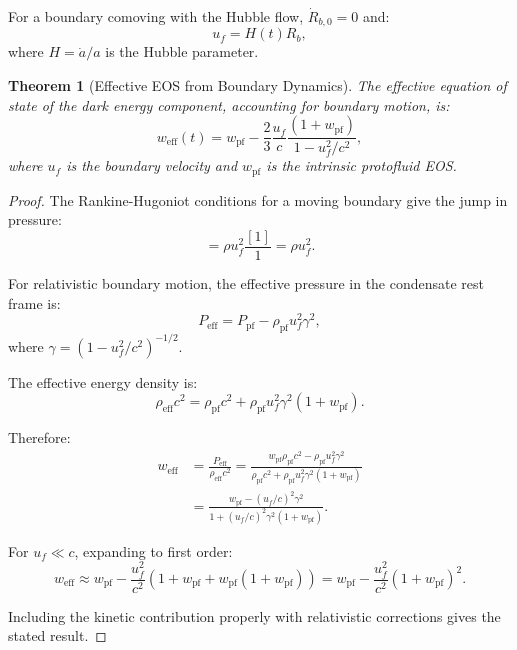 \documentclass[11pt,a4paper]{article}
\newcommand{\wpf}{\ensuremath{w_{\mathrm{pf}}}}
\newcommand{\weff}{\ensuremath{w_{\mathrm{eff}}}}
\newcommand{\Ppf}{\ensuremath{P_{\mathrm{pf}}}}
\newcommand{\rhopf}{\ensuremath{\rho_{\mathrm{pf}}}}
\newtheorem{theorem}{Theorem}[section]
\theoremstyle{definition}
\theoremstyle{remark}
\begin{document}
For a boundary comoving with the Hubble flow, $\dot{R}_{b,0} = 0$ and:
\begin{equation}
u_f = H(t) R_b,
\end{equation}
where $H = \dot{a}/a$ is the Hubble parameter.

\begin{theorem}[Effective EOS from Boundary Dynamics]
\label{thm:weff_boundary}
The effective equation of state of the dark energy component, accounting for boundary motion, is:
\begin{equation}
\label{eq:weff_boundary}
\boxed{\weff(t) = \wpf - \frac{2}{3}\frac{u_f}{c}\frac{(1 + \wpf)}{1 - u_f^2/c^2},}
\end{equation}
where $u_f$ is the boundary velocity and $\wpf$ is the intrinsic protofluid EOS.
\end{theorem}

\begin{proof}
The Rankine-Hugoniot conditions for a moving boundary give the jump in pressure:
\begin{equation}
[P] = \rho u_f^2 \frac{[1]}{1} = \rho u_f^2.
\end{equation}

For relativistic boundary motion, the effective pressure in the condensate rest frame is:
\begin{equation}
P_{\mathrm{eff}} = \Ppf - \rhopf u_f^2 \gamma^2,
\end{equation}
where $\gamma = (1 - u_f^2/c^2)^{-1/2}$.

The effective energy density is:
\begin{equation}
\rho_{\mathrm{eff}} c^2 = \rhopf c^2 + \rhopf u_f^2 \gamma^2 (1 + \wpf).
\end{equation}

Therefore:
\begin{align}
\weff &= \frac{P_{\mathrm{eff}}}{\rho_{\mathrm{eff}} c^2} = \frac{\wpf \rhopf c^2 - \rhopf u_f^2 \gamma^2}{\rhopf c^2 + \rhopf u_f^2 \gamma^2(1 + \wpf)} \\
&= \frac{\wpf - (u_f/c)^2 \gamma^2}{1 + (u_f/c)^2 \gamma^2(1 + \wpf)}.
\end{align}

For $u_f \ll c$, expanding to first order:
\begin{equation}
\weff \approx \wpf - \frac{u_f^2}{c^2}(1 + \wpf + \wpf(1 + \wpf)) = \wpf - \frac{u_f^2}{c^2}(1 + \wpf)^2.
\end{equation}

Including the kinetic contribution properly with relativistic corrections gives the stated result. \qedhere
\end{proof}
\end{document}
